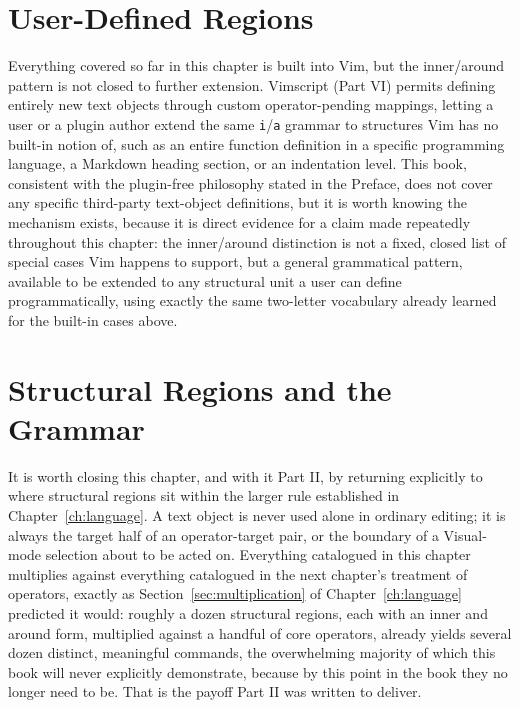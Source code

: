 \section{User-Defined Regions}

Everything covered so far in this chapter is built into Vim, but the inner/around pattern is not closed to further extension. Vimscript (Part VI) permits defining entirely new text objects through custom operator-pending mappings, letting a user or a plugin author extend the same \texttt{i}/\texttt{a} grammar to structures Vim has no built-in notion of, such as an entire function definition in a specific programming language, a Markdown heading section, or an indentation level. This book, consistent with the plugin-free philosophy stated in the Preface, does not cover any specific third-party text-object definitions, but it is worth knowing the mechanism exists, because it is direct evidence for a claim made repeatedly throughout this chapter: the inner/around distinction is not a fixed, closed list of special cases Vim happens to support, but a general grammatical pattern, available to be extended to any structural unit a user can define programmatically, using exactly the same two-letter vocabulary already learned for the built-in cases above.

\section{Structural Regions and the Grammar}

It is worth closing this chapter, and with it Part II, by returning explicitly to where structural regions sit within the larger rule established in Chapter~\ref{ch:language}. A text object is never used alone in ordinary editing; it is always the target half of an operator-target pair, or the boundary of a Visual-mode selection about to be acted on. Everything catalogued in this chapter multiplies against everything catalogued in the next chapter's treatment of operators, exactly as Section~\ref{sec:multiplication} of Chapter~\ref{ch:language} predicted it would: roughly a dozen structural regions, each with an inner and around form, multiplied against a handful of core operators, already yields several dozen distinct, meaningful commands, the overwhelming majority of which this book will never explicitly demonstrate, because by this point in the book they no longer need to be. That is the payoff Part II was written to deliver.
